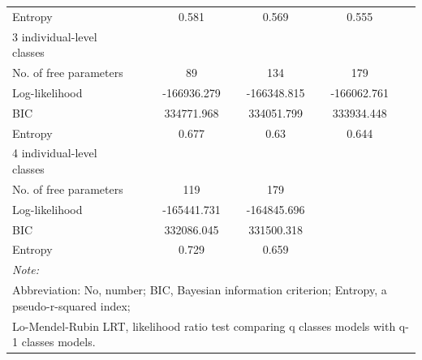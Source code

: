 \begin{table}[H]
\begin{tabular}[t]{lccccc}
		\hspace{1em}\hspace{1em}Entropy &  & 0.581 & 0.569 & 0.555 & \\
		\hspace{1em}3 individual-level classes &  &  &  &  & \\
		\hspace{1em}\hspace{1em}No. of free parameters &  & 89 & 134 & 179 & \\
		\hspace{1em}\hspace{1em}Log-likelihood &  & -166936.279 & -166348.815 & -166062.761 & \\
		\hspace{1em}\hspace{1em}BIC &  & 334771.968 & 334051.799 & 333934.448 & \\
		\hspace{1em}\hspace{1em}Entropy &  & 0.677 & 0.63 & 0.644 & \\
		\hspace{1em}4 individual-level classes &  &  &  &  & \\
		\hspace{1em}\hspace{1em}No. of free parameters &  & 119 & 179 &  & \\
		\hspace{1em}\hspace{1em}Log-likelihood &  & -165441.731 & -164845.696 &  & \\
		\hspace{1em}\hspace{1em}BIC &  & 332086.045 & 331500.318 &  & \\
		\hspace{1em}\hspace{1em}Entropy &  & 0.729 & 0.659 &  & \\
		\bottomrule
		\multicolumn{6}{l}{\textit{Note: }}\\
		\multicolumn{6}{l}{Abbreviation: No, number; BIC, Bayesian information criterion; Entropy, a pseudo-r-squared index;}\\ 
		\multicolumn{6}{l}{Lo-Mendel-Rubin LRT, likelihood ratio test comparing q classes models with q-1 classes models.}\\
	\end{tabular}
\end{table}






